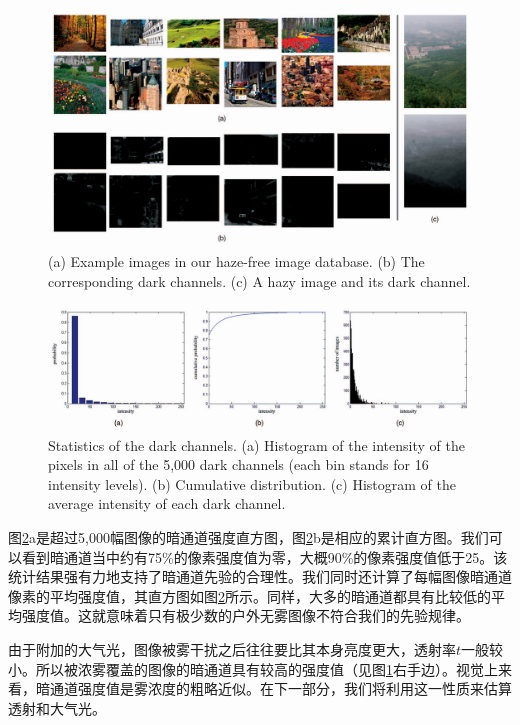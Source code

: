 \documentclass{ctexart}
\begin{document}
\begin{figure}[tbp]
	\centering
	\includegraphics[width=\textwidth]{img/04.png}
	\caption{(a) Example images in our haze-free image database. (b) The corresponding dark channels. (c) A hazy image and its dark channel.}\label{fig:04}
\end{figure}

\begin{figure}[bp]
	\centering
	\includegraphics[width=\textwidth]{img/05.png}
	\caption{Statistics of the dark channels. (a) Histogram of the intensity of the pixels in all of the 5,000 dark channels (each bin stands for 16 intensity levels). (b) Cumulative distribution. (c) Histogram of the average intensity of each dark channel.}\label{fig:05}
\end{figure}

图\ref{fig:05}a是超过5,000幅图像的暗通道强度直方图，图\ref{fig:05}b是相应的累计直方图。我们可以看到暗通道当中约有75\%的像素强度值为零，大概90\%的像素强度值低于25。该统计结果强有力地支持了暗通道先验的合理性。我们同时还计算了每幅图像暗通道像素的平均强度值，其直方图如图\ref{fig:05}所示。同样，大多的暗通道都具有比较低的平均强度值。这就意味着只有极少数的户外无雾图像不符合我们的先验规律。\par

由于附加的大气光，图像被雾干扰之后往往要比其本身亮度更大，透射率$t$一般较小。所以被浓雾覆盖的图像的暗通道具有较高的强度值（见图\ref{fig:04}右手边）。视觉上来看，暗通道强度值是雾浓度的粗略近似。在下一部分，我们将利用这一性质来估算透射和大气光。\par
\end{document}
